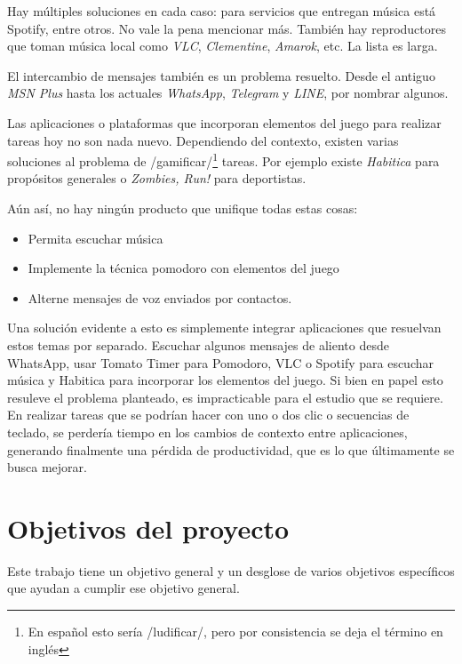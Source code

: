 \documentclass[12pt,letterpaper]{report}
\providecommand{\tightlist}{%
  \setlength{\itemsep}{0pt}\setlength{\parskip}{0pt}}
\begin{document}
Hay múltiples soluciones en cada caso: para servicios que entregan
música está Spotify, entre otros. No vale la pena mencionar más. También
hay reproductores que toman música local como \emph{VLC},
\emph{Clementine}, \emph{Amarok}, etc. La lista es larga.

El intercambio de mensajes también es un problema resuelto. Desde el
antiguo \emph{MSN Plus} hasta los actuales \emph{WhatsApp},
\emph{Telegram} y \emph{LINE}, por nombrar algunos.

Las aplicaciones o plataformas que incorporan elementos del juego para
realizar tareas hoy no son nada nuevo. Dependiendo del contexto, existen
varias soluciones al problema de /gamificar/\footnote{En español esto
  sería /ludificar/, pero por consistencia se deja el término en inglés}
tareas. Por ejemplo existe \emph{Habitica} para propósitos generales o
\emph{Zombies, Run!} para deportistas.

Aún así, no hay ningún producto que unifique todas estas cosas:

\begin{itemize}
\tightlist
\item
  Permita escuchar música
\item
  Implemente la técnica pomodoro con elementos del juego
\item
  Alterne mensajes de voz enviados por contactos.
\end{itemize}

Una solución evidente a esto es simplemente integrar aplicaciones que
resuelvan estos temas por separado. Escuchar algunos mensajes de aliento
desde WhatsApp, usar Tomato Timer para Pomodoro, VLC o Spotify para
escuchar música y Habitica para incorporar los elementos del juego. Si
bien en papel esto resuleve el problema planteado, es impracticable para
el estudio que se requiere. En realizar tareas que se podrían hacer con
uno o dos clic o secuencias de teclado, se perdería tiempo en los
cambios de contexto entre aplicaciones, generando finalmente una pérdida
de productividad, que es lo que últimamente se busca mejorar.

\newpage
\hypertarget{objetivos-del-proyecto}{%
\section{Objetivos del proyecto}\label{objetivos-del-proyecto}}

Este trabajo tiene un objetivo general y un desglose de varios objetivos
específicos que ayudan a cumplir ese objetivo general.
\end{document}
